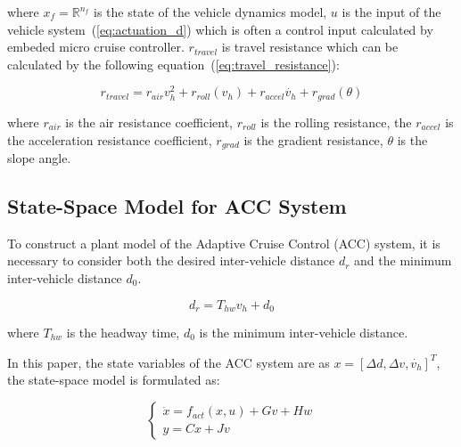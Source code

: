 \documentclass{article}
\numberwithin{equation}{section}
\begin{document}
\noindent where $x_f=\mathbb{R}^{n_{f}}$ is the state of the vehicle dynamics model, $u$ is the input of the 
vehicle system~(\ref{eq:actuation_d}) which is often a control input calculated by embeded 
micro cruise controller. $r_{travel}$ is travel resistance which can be calculated by the
following equation~(\ref{eq:travel_resistance}):

\begin{equation}
    r_{travel}=r_{air}v_h^2 + r_{roll}(v_h)+r_{accel}\dot{v_h}+r_{grad}(\theta)\label{eq:travel_resistance}
\end{equation}
    
\noindent where $r_{air}$ is the air resistance coefficient, $r_{roll}$ is the rolling resistance,
the $r_{accel}$ is the acceleration resistance coefficient, $r_{grad}$ is the gradient resistance,
$\theta$ is the slope angle. 

\subsection{State-Space Model for ACC System}

To construct a plant model of the Adaptive Cruise Control (ACC) system, it is necessary to consider 
both the desired inter-vehicle distance $d_r$ and the minimum inter-vehicle distance $d_0$.

\begin{equation}
    d_r = T_{hw}v_h+d_0\label{eq:inter_vehicle_distance}
\end{equation}

\noindent where $T_{hw}$ is the headway time, $d_0$ is the minimum inter-vehicle distance.

In this paper, the state variables of the ACC system are as $x=[\Delta d,\Delta v,\dot{v_h}]^T$, the
state-space model is formulated as:

\begin{equation}
    \left\{\begin{array}{l}\label{eq:state_space_model}
        \dot{x}=f_{a c t}\left(x, u\right) + Gv + Hw \\
        y=Cx+Jv
        \end{array}\right.
\end{equation}
\end{document}
